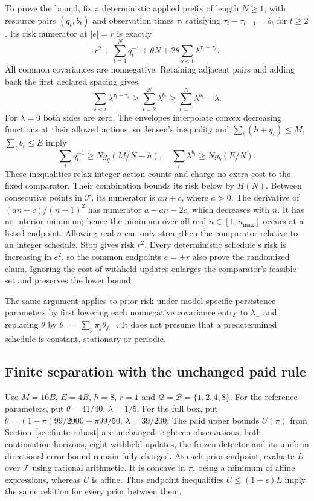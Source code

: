 To prove the bound, fix a deterministic applied prefix of length $N\ge1$, with resource pairs $(q_t,b_t)$ and observation times $\tau_t$ satisfying $\tau_t-\tau_{t-1}=b_t$ for $t\ge2$.
Its risk numerator at $|e|=r$ is exactly
\[
r^2+\sum_{t=1}^Nq_t^{-1}+\theta N+2\theta\sum_{s<t}\lambda^{\tau_t-\tau_s}.
\]
All common covariances are nonnegative.
Retaining adjacent pairs and adding back the first declared spacing gives
\[
\sum_{s<t}\lambda^{\tau_t-\tau_s}\ge\sum_{t=2}^N\lambda^{b_t}
\ge\sum_{t=1}^N\lambda^{b_t}-\lambda.
\]
For $\lambda=0$ both sides are zero.
The envelopes interpolate convex decreasing functions at their allowed actions, so Jensen's inequality and $\sum_t(h+q_t)\le M$, $\sum_tb_t\le E$ imply
\[
\sum_tq_t^{-1}\ge Ng_q(M/N-h),\quad
\sum_t\lambda^{b_t}\ge Ng_b(E/N).
\]
These inequalities relax integer action counts and charge no extra cost to the fixed comparator.
Their combination bounds its risk below by $H(N)$.
Between consecutive points in $\mathcal T$, its numerator is $an+c$, where $a>0$.
The derivative of $(an+c)/(n+1)^2$ has numerator $a-an-2c$, which decreases with $n$.
It has no interior minimum; hence the minimum over all real $n\in[1,n_{\max}]$ occurs at a listed endpoint.
Allowing real $n$ can only strengthen the comparator relative to an integer schedule.
Stop gives risk $r^2$.
Every deterministic schedule's risk is increasing in $e^2$, so the common endpoints $e=\pm r$ also prove the randomized claim.
Ignoring the cost of withheld updates enlarges the comparator's feasible set and preserves the lower bound.

The same argument applies to prior risk under model-specific persistence parameters by first lowering each nonnegative covariance entry to $\lambda_-$ and replacing $\theta$ by $\bar\theta_-=\sum_j\pi_j\theta_{j,-}$.
It does not presume that a predetermined schedule is constant, stationary or periodic.

\subsection{Finite separation with the unchanged paid rule}
Use $M=16B$, $E=4B$, $h=8$, $r=1$ and $\mathcal Q=\mathcal B=\{1,2,4,8\}$.
For the reference parameters, put $\theta=41/40$, $\lambda=1/5$.
For the full box, put $\theta=(1-\pi)99/2000+\pi99/50$, $\lambda=39/200$.
The paid upper bounds $U(\pi)$ from Section~\ref{sec:finite-robust} are unchanged: eighteen observations, both continuation horizons, eight withheld updates, the frozen detector and its uniform directional error bound remain fully charged.
At each prior endpoint, evaluate $L$ over $\mathcal T$ using rational arithmetic.
It is concave in $\pi$, being a minimum of affine expressions, whereas $U$ is affine.
Thus endpoint inequalities $U\le(1-\epsilon)L$ imply the same relation for every prior between them.

